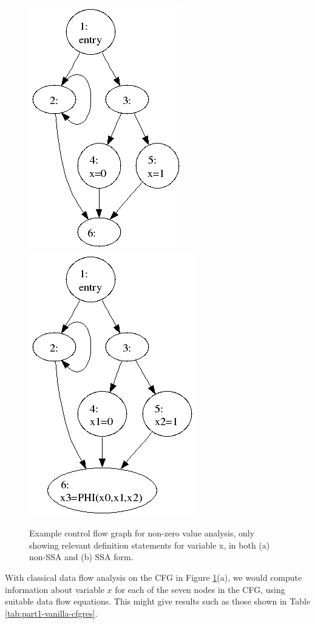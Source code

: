 \begin{figure}
\begin{center}
\includegraphics[scale=0.3]{cfg_example.png}
%
\includegraphics[scale=0.3]{ssa_example.png}
\end{center}
\caption{\label{fig:part1-vanilla-cfgexample}Example control flow graph for
  non-zero value analysis, only showing relevant definition statements for
  variable x, in both (a) non-SSA and (b) SSA form.}
\end{figure}


With classical data flow analysis on the CFG in Figure
\ref{fig:part1-vanilla-cfgexample}(a),
we would compute information about variable $x$ for each of the seven nodes
in the CFG, using suitable data flow equations.
This might give results such as those shown in Table
\ref{tab:part1-vanilla-cfgres}.

